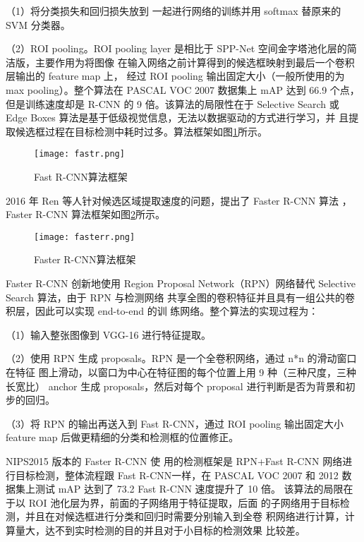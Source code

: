 （1）将分类损失和回归损失放到
一起进行网络的训练并用 softmax 替原来的 SVM 分类器。

（2）ROI pooling。ROI
pooling layer 是相比于 SPP-Net 空间金字塔池化层的简洁版，主要作用为将图像
在输入网络之前计算得到的候选框映射到最后一个卷积层输出的 feature map 上，
经过 ROI pooling 输出固定大小（一般所使用的为 max pooling）。整个算法在
PASCAL VOC 2007 数据集上 mAP 达到 66.9%
个点，但是训练速度却是 R-CNN 的 9 倍。该算法的局限性在于 Selective Search
或 Edge Boxes 算法是基于低级视觉信息，无法以数据驱动的方式进行学习，并
且提取候选框过程在目标检测中耗时过多。算法框架如图\ref{fastr}所示。

\begin{figure}[htbp]
    \centering
    \texttt{[image: fastr.png]}
    \caption{Fast R-CNN算法框架}
    \label{fastr}
\end{figure}

2016 年 Ren 等人针对候选区域提取速度的问题，提出了 Faster R-CNN 算法
\cite{ren2015faster}，Faster R-CNN 算法框架如图\ref{fasterr}所示。

\begin{figure}[htbp]
    \centering
    \texttt{[image: fasterr.png]}
    \caption{Faster R-CNN算法框架}
    \label{fasterr}
\end{figure}

Faster R-CNN 创新地使用 Region
Proposal Network（RPN）网络替代 Selective Search 算法，由于 RPN 与检测网络
共享全图的卷积特征并且具有一组公共的卷积层，因此可以实现 end-to-end 的训
练网络。整个算法的实现过程为：

（1）输入整张图像到 VGG-16 进行特征提取。

（2）使用 RPN 生成 proposals。RPN 是一个全卷积网络，通过 n*n 的滑动窗口在特征
图上滑动，以窗口为中心在特征图的每个位置上用 9 种（三种尺度，三种长宽比）
anchor 生成 proposals，然后对每个 proposal 进行判断是否为背景和初步的回归。

（3）将 RPN 的输出再送入到 Fast R-CNN，通过 ROI pooling 输出固定大小 feature
map 后做更精细的分类和检测框的位置修正。

NIPS2015 版本的 Faster R-CNN 使
用的检测框架是 RPN+Fast R-CNN 网络进行目标检测，整体流程跟 Fast R-CNN一样，在 PASCAL VOC 2007 和 2012 数据集上测试 mAP 达到了 73.2%
Fast R-CNN 速度提升了 10 倍。
该算法的局限在于以 ROI 池化层为界，前面的子网络用于特征提取，后面
的子网络用于目标检测，并且在对候选框进行分类和回归时需要分别输入到全卷
积网络进行计算，计算量大，达不到实时检测的目的并且对于小目标的检测效果
比较差。

